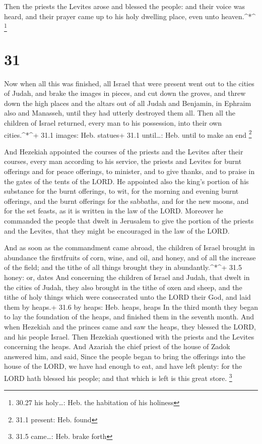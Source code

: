  Then the priests the Levites arose and blessed the people:
and their voice was heard, and their prayer came up to his holy dwelling
place, even unto heaven.\^{}*\^{} \footnote{30.27 his holy\ldots: Heb.
  the habitation of his holiness}

\hypertarget{section-30}{%
\section{31}\label{section-30}}

 Now when all this was finished, all Israel that were
present went out to the cities of Judah, and brake the images in pieces,
and cut down the groves, and threw down the high places and the altars
out of all Judah and Benjamin, in Ephraim also and Manasseh, until they
had utterly destroyed them all. Then all the children of Israel
returned, every man to his possession, into their own cities.\^{}*\^{}+
31.1 images: Heb. statues+ 31.1 until\ldots: Heb. until to make an end
\footnote{31.1 present: Heb. found}

 And Hezekiah appointed the courses of the priests and the
Levites after their courses, every man according to his service, the
priests and Levites for burnt offerings and for peace offerings, to
minister, and to give thanks, and to praise in the gates of the tents of
the LORD.  He appointed also the king's portion of his
substance for the burnt offerings, to wit, for the morning and evening
burnt offerings, and the burnt offerings for the sabbaths, and for the
new moons, and for the set feasts, as it is written in the law of the
LORD.  Moreover he commanded the people that dwelt in
Jerusalem to give the portion of the priests and the Levites, that they
might be encouraged in the law of the LORD.

 And as soon as the commandment came abroad, the children of
Israel brought in abundance the firstfruits of corn, wine, and oil, and
honey, and of all the increase of the field; and the tithe of all things
brought they in abundantly.\^{}*\^{}+ 31.5 honey: or, dates 
And concerning the children of Israel and Judah, that dwelt in the
cities of Judah, they also brought in the tithe of oxen and sheep, and
the tithe of holy things which were consecrated unto the LORD their God,
and laid them by heaps.+ 31.6 by heaps: Heb. heaps, heaps 
In the third month they began to lay the foundation of the heaps, and
finished them in the seventh month.  And when Hezekiah and
the princes came and saw the heaps, they blessed the LORD, and his
people Israel.  Then Hezekiah questioned with the priests
and the Levites concerning the heaps.  And Azariah the
chief priest of the house of Zadok answered him, and said, Since the
people began to bring the offerings into the house of the LORD, we have
had enough to eat, and have left plenty: for the LORD hath blessed his
people; and that which is left is this great store. \footnote{31.5
  came\ldots: Heb. brake forth}

